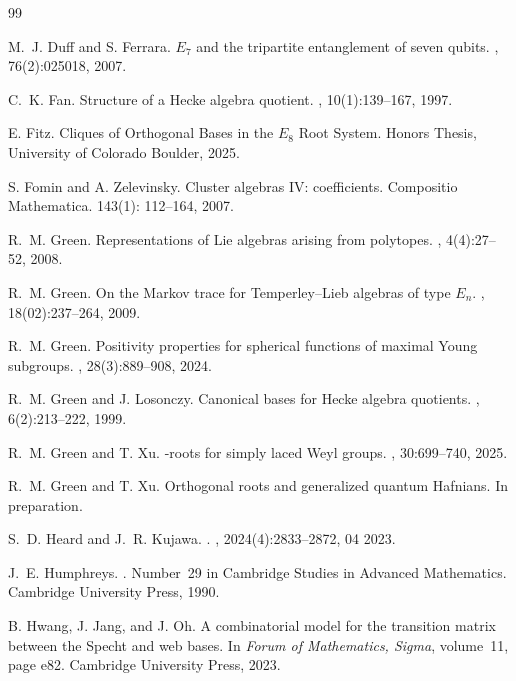 \documentclass[11pt]{amsart}
\theoremstyle{plain}
\theoremstyle{definition}
\theoremstyle{remark}
\numberwithin{equation}{subsection}
\begin{document}
\begin{thebibliography}{99}
 
M.~J. Duff and S. Ferrara.
\newblock ${E}_7$ and the tripartite entanglement of seven qubits.
, 76(2):025018, 2007.
 

C.~K. Fan.
\newblock Structure of a {H}ecke algebra quotient.
, 10(1):139--167,
  1997.

E. Fitz.
\newblock Cliques of Orthogonal Bases in the $E_8$ Root System.
\newblock Honors Thesis, University of Colorado Boulder, 2025.
  

S. Fomin and A. Zelevinsky.
\newblock Cluster algebras IV: coefficients.
\newblock Compositio Mathematica. 143(1): 112–164, 2007.

R.~M. Green.
\newblock Representations of {L}ie algebras arising from polytopes.
, 4(4):27--52, 2008.

R.~M. Green.
\newblock On the {M}arkov trace for {T}emperley--{L}ieb algebras of type
  ${E}_n$.
, 18(02):237--264,
  2009.

R.~M. Green.
\newblock Positivity properties for spherical functions of maximal {Y}oung
  subgroups.
, 28(3):889--908, 2024.

R.~M. Green and J. Losonczy.
\newblock Canonical bases for Hecke algebra quotients.
, 6(2):213--222, 1999.

R.~M. Green and T. Xu.
-roots for simply laced {W}eyl groups.
, 30:699--740, 2025.

R.~M. Green and T. Xu.
\newblock Orthogonal roots and generalized quantum {H}afnians.
\newblock In preparation.

S.~D. Heard and J.~R. Kujawa.
.
, 2024(4):2833--2872,
  04 2023.

J.~E. Humphreys.
.
\newblock Number~29 in Cambridge Studies in Advanced Mathematics. Cambridge
  University Press, 1990.

B. Hwang, J. Jang, and J. Oh.
\newblock A combinatorial model for the transition matrix between the {S}pecht
  and web bases.
\newblock In {\em Forum of Mathematics, Sigma}, volume~11, page e82. Cambridge
  University Press, 2023.


\end{thebibliography}
\end{document}
